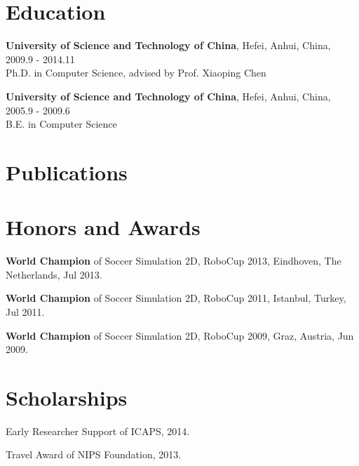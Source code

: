 \documentclass[letterpaper,10pt]{article}
\renewenvironment{itemize}{
  \begin{list}{}{
    \setlength{\leftmargin}{1.5em}
  }
}{
  \end{list}
}
\begin{document}
\vspace{10pt}
\section*{Education}
\begin{itemize}
	\item \textbf{University of Science and Technology of China}, Hefei, Anhui, China, 2009.9 - 2014.11 \\
	      Ph.D. in Computer Science, advised by Prof. Xiaoping Chen
	\item \textbf{University of Science and Technology of China}, Hefei, Anhui, China, 2005.9 - 2009.6 \\
	      B.E. in Computer Science
\end{itemize}

\vspace{10pt}
\section*{Publications}
\nocite{*}



\vspace{10pt}
\section*{Honors and Awards}
\begin{itemize}
	\item \textbf{World Champion} of Soccer Simulation 2D, RoboCup 2013, Eindhoven, The Netherlands, Jul 2013.
	\item \textbf{World Champion} of Soccer Simulation 2D, RoboCup 2011, Istanbul, Turkey, Jul 2011.
	\item \textbf{World Champion} of Soccer Simulation 2D, RoboCup 2009, Graz, Austria, Jun 2009.
\end{itemize}

\vspace{10pt}
\section*{Scholarships}
\begin{itemize}
	\item Early Researcher Support of ICAPS, 2014.
	\item Travel Award of NIPS Foundation, 2013.
\end{itemize}

\vspace{10pt}
\end{document}
